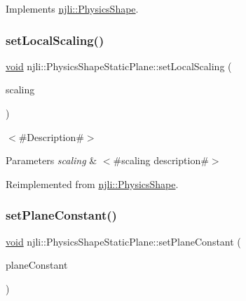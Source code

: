 Implements \mbox{\hyperlink{classnjli_1_1_physics_shape_a441e82a42f3b588a409c3b6c41288abd}{njli\+::\+Physics\+Shape}}.

\mbox{\label{classnjli_1_1_physics_shape_static_plane_a2f6934822e6cfe1e4653809231fb4218}} 
\subsubsection{\texorpdfstring{set\+Local\+Scaling()}{setLocalScaling()}}
{\footnotesize\ttfamily \mbox{\hyperlink{_thread_8h_af1e856da2e658414cb2456cb6f7ebc66}{void}} njli\+::\+Physics\+Shape\+Static\+Plane\+::set\+Local\+Scaling (\begin{DoxyParamCaption}\item[{const bt\+Vector3 \&}]{scaling }\end{DoxyParamCaption})\hspace{0.3cm}{\ttfamily [virtual]}}

$<$\#\+Description\#$>$


\begin{DoxyParams}{Parameters}
{\em scaling} & $<$\#scaling description\#$>$ \\
\hline
\end{DoxyParams}


Reimplemented from \mbox{\hyperlink{classnjli_1_1_physics_shape_afd2f02f3fd7ab5c1b48f445f2831f18f}{njli\+::\+Physics\+Shape}}.

\mbox{\label{classnjli_1_1_physics_shape_static_plane_a046e8fdb529ee0d0ec14c81cba9c58bc}} 
\subsubsection{\texorpdfstring{set\+Plane\+Constant()}{setPlaneConstant()}}
{\footnotesize\ttfamily \mbox{\hyperlink{_thread_8h_af1e856da2e658414cb2456cb6f7ebc66}{void}} njli\+::\+Physics\+Shape\+Static\+Plane\+::set\+Plane\+Constant (\begin{DoxyParamCaption}\item[{\mbox{\hyperlink{_util_8h_a5f6906312a689f27d70e9d086649d3fd}{f32}}}]{plane\+Constant }\end{DoxyParamCaption})}

